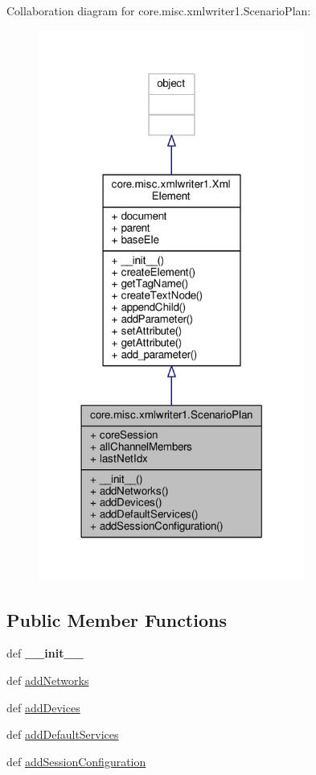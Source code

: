 Collaboration diagram for core.\+misc.\+xmlwriter1.\+Scenario\+Plan\+:
\nopagebreak
\begin{figure}[H]
\begin{center}
\leavevmode
\includegraphics[width=248pt]{classcore_1_1misc_1_1xmlwriter1_1_1_scenario_plan__coll__graph}
\end{center}
\end{figure}
\subsection*{Public Member Functions}
\begin{DoxyCompactItemize}
\item 
\hypertarget{classcore_1_1misc_1_1xmlwriter1_1_1_scenario_plan_ac5cce4640069771d710698fe04e3069e}{def {\bfseries \+\_\+\+\_\+init\+\_\+\+\_\+}}\label{classcore_1_1misc_1_1xmlwriter1_1_1_scenario_plan_ac5cce4640069771d710698fe04e3069e}

\item 
def \hyperlink{classcore_1_1misc_1_1xmlwriter1_1_1_scenario_plan_a1751e131991df8d796568e298c39a65e}{add\+Networks}
\item 
def \hyperlink{classcore_1_1misc_1_1xmlwriter1_1_1_scenario_plan_a4456b0a909f52aa13321fbda7193f500}{add\+Devices}
\item 
def \hyperlink{classcore_1_1misc_1_1xmlwriter1_1_1_scenario_plan_aaa7026a1ee406e26bd49c22fbc1be85f}{add\+Default\+Services}
\item 
def \hyperlink{classcore_1_1misc_1_1xmlwriter1_1_1_scenario_plan_a0d85953dea458ab59543070ba7580e29}{add\+Session\+Configuration}
\end{DoxyCompactItemize}

